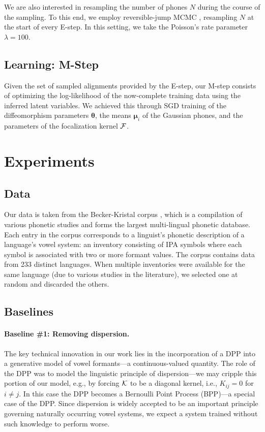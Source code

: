 \documentclass[11pt,a4paper]{article}
\newcommand{\vtheta}{{\boldsymbol \theta}}
\newcommand{\vmu}{{\boldsymbol \mu}}
\begin{document}
We are also interested in resampling the number of phones $N$ during
the course of the sampling.  To this end, we employ reversible-jump
MCMC \cite{green1995reversible}, resampling $N$ at the start of every
E-step. In this setting,
we take the Poisson's rate parameter $\lambda = 100$.

\subsection{Learning: M-Step}
Given the set of sampled alignments provided by the E-step, our M-step
consists of optimizing the log-likelihood of the now-complete training data using
the inferred latent variables. 
We achieved this through SGD training of the diffeomorphism parameters $\vtheta$,
the means $\vmu_i$ of the Gaussian phones, and the parameters of the
focalization kernel ${\cal F}$. 

\section{Experiments}

\subsection{Data}
Our data is taken from the Becker-Kristal corpus
\cite{becker2006predicting}, which is a compilation of various
phonetic studies and forms the largest multi-lingual phonetic
database.
Each entry in the corpus corresponds to a linguist's phonetic description
of a language's vowel system: an inventory consisting of IPA symbols
where each symbol is associated with two or more formant values.  The
corpus contains data from 233 distinct languages.  When multiple
inventories were available for the same language (due to various
studies in the literature), we selected one at random and
discarded the others.

\subsection{Baselines}

\paragraph{Baseline \#1: Removing dispersion.}

The key technical innovation in our work lies in the incorporation of
a DPP into a generative model of vowel formants---a continuous-valued
quantity. The role of the DPP was to model the linguistic principle of
dispersion---we may cripple this portion of our model, e.g., by
forcing ${\cal K}$ to be a diagonal kernel, i.e., $K_{ij} = 0$ for
$i \neq j$.  In this case the DPP becomes a Bernoulli Point Process
(BPP)---a special case of the DPP. Since dispersion is widely accepted
to be an important principle governing naturally occurring vowel
systems, we expect a system trained without such knowledge to
perform worse.
\end{document}
